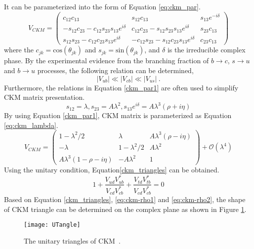 It can be parameterized into the form of Equation \ref{eq:ckm_par}.
\begin{equation}\label{eq:ckm_par}
V_{CKM}=
\begin{pmatrix}
c_{12}c_{13} & s_{12}c_{13} & s_{13}e^{-i\delta }\\
-s_{12}c_{23}-c_{12}s_{23}s_{13}e^{i\delta } &c_{12}c_{23}-s_{12}s_{23}s_{13}e^{i\delta } & s_{23}c_{13}\\
s_{12}s_{23}-c_{12}c_{23}s_{13}e^{i\delta }  & -c_{12}s_{23}-s_{12}c_{23}s_{13}e^{i\delta } & c_{23}c_{13}
\end{pmatrix}
\end{equation}
where the $c_{jk}=\text{cos}(\theta_{jk})$ and $s_{jk}=\text{sin}(\theta_{jk})$, and $\delta$ is the irreducible complex phase. By the experimental evidence from the branching fraction of $b\to c$, $s\to u$ and $b\to u$ processes, the following relation can be determined,
\begin{equation}\label{eq:ckm_larger}
|V_{ub}|\ll |V_{cb}|\ll |V_{us}|~.
\end{equation}
Furthermore, the relations in Equation \ref{ckm_par1} are often used to simplify CKM matrix presentation.
\begin{equation}\label{ckm_par1}
s_{12}=\lambda , s_{23}=A\lambda^2, s_{13}e^{i\delta}=A\lambda^3(\rho+i\eta)
\end{equation}
By using Equation \ref{ckm_par1}, CKM matrix is parameterized as Equation \ref{eq:ckm_lambda}.
\begin{equation}\label{eq:ckm_lambda}
V_{CKM}=
\begin{pmatrix}
1-\lambda^2/2 & \lambda & A\lambda^3(\rho-i\eta)\\
-\lambda & 1-\lambda^2/2 & A\lambda^2\\
A\lambda^3(1-\rho-i\eta) & -A\lambda^2 & 1
\end{pmatrix}+\mathcal{O}(\lambda^4)
\end{equation}
Using the unitary condition, Equation\ref{ckm_triangles} can be obtained.
\begin{equation}\label{ckm_triangles}
1+
\frac{V_{ud}V^*_{ub}}{V_{cd}V^*_{cb}}+
\frac{V_{td}V^*_{tb}}{V_{cd}V^*_{cb}}
=0
\end{equation}
Based on Equation \ref{ckm_triangles}, \ref{eq:ckm-rho1} and \ref{eq:ckm-rho2}, the shape of CKM triangle can be determined on the complex plane as shown in Figure \ref{fig:ckm_angles}.
\begin{figure}[htpb]
	\centering
	\texttt{[image: UTangle]}
	\caption{The unitary triangles of CKM~\cite{ceccucci2008ckm}.}
	\label{fig:ckm_angles}
\end{figure}
